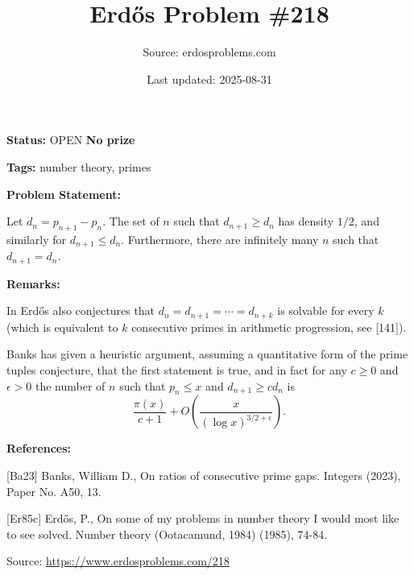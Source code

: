 \documentclass{article}
\title{Erd\H{o}s Problem \#218}
\date{Last updated: 2025-08-31}
\author{Source: erdosproblems.com}
\begin{document}
\maketitle

\noindent\textbf{Status:} OPEN \quad \textbf{No prize}

\noindent\textbf{Tags:} number theory, primes

\medskip
\noindent\textbf{Problem Statement:}

Let $d_n=p_{n+1}-p_n$. The set of $n$ such that $d_{n+1}\geq d_n$ has density $1/2$, and similarly for $d_{n+1}\leq d_n$. Furthermore, there are infinitely many $n$ such that $d_{n+1}=d_n$.

\bigskip
\noindent\textbf{Remarks:}

In \cite{Er85c} Erd\H{o}s also conjectures that $d_n=d_{n+1}=\cdots=d_{n+k}$ is solvable for every $k$ (which is equivalent to $k$ consecutive primes in arithmetic progression, see [141]).

Banks \cite{Ba23} has given a heuristic argument, assuming a quantitative form of the prime tuples conjecture, that the first statement is true, and in fact for any $c\geq 0$ and $\epsilon>0$ the number of $n$ such that $p_n\leq x$ and $d_{n+1}\geq cd_n$ is\[\frac{\pi(x)}{c+1}+O\left(\frac{x}{(\log x)^{3/2+\epsilon}}\right).\]

\bigskip
\noindent\textbf{References:}

[Ba23] Banks, William D., On ratios of consecutive prime gaps. Integers (2023), Paper No. A50, 13.
 
 [Er85c] Erd\H{o}s, P., On some of my problems in number theory I would most like to see solved. Number theory (Ootacamund, 1984) (1985), 74-84.

\bigskip
\noindent\small{Source: \url{https://www.erdosproblems.com/218}}
\end{document}
